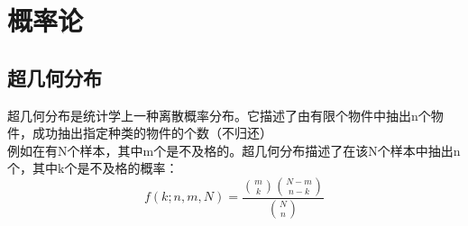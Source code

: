 \documentclass[main.tex]{subfiles}
\begin{document}
\chapter{概率论}
\section{超几何分布}
    超几何分布是统计学上一种离散概率分布。它描述了由有限个物件中抽出n个物件，成功抽出指定种类的物件的个数（不归还）\\
    例如在有N个样本，其中m个是不及格的。超几何分布描述了在该N个样本中抽出n个，其中k个是不及格的概率： \\
    $$  f(k;n,m,N) = \frac{\binom{m}{k} \binom{N-m}{n-k}}{\binom{N}{n}} $$
\end{document}
